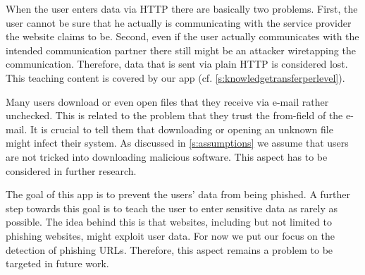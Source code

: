 \begin{description}[leftmargin=0cm]
	\item[Data Entry Via HTTPS:] 	When the user enters data via HTTP there are basically two problems.
	First, the user cannot be sure that he actually is communicating with the service provider the website claims to be.
Second, even if the user actually communicates with the intended communication partner there still might be an attacker wiretapping the communication.
Therefore, data that is sent via plain HTTP is considered lost. 
	This teaching content is covered by our app (cf. \autoref{s:knowledgetransferperlevel}).	
	\item[Do Not Download Attachments] Many users download or even open files that they receive via e-mail rather unchecked.
	This is related to the problem that they trust the from-field of the e-mail.
	It is crucial to tell them that downloading or opening an unknown file might infect their system.
	As discussed in \autoref{s:assumptions} we assume that users are not tricked into downloading malicious software.
This aspect has to be considered in further research.
	\item[Data Economy] The goal of this app is to prevent the users' data from being phished.
	A further step towards this goal is to teach the user to enter sensitive data as rarely as possible.
	The idea behind this is that websites, including but not limited to phishing websites, might exploit user data. 
	For now we put our focus on the detection of phishing URLs.
Therefore, this aspect remains a problem to be targeted in future work.
\end{description}

